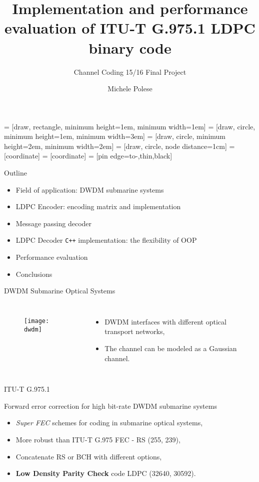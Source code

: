 \documentclass[pdf]
          {beamer}
\title{Implementation and performance evaluation of ITU-T G.975.1 LDPC binary code}
\subtitle{Channel Coding 15/16 Final Project}
\author{Michele Polese}
\begin{document}
 = [draw, rectangle, 
    minimum height=1em, minimum width=1em]
 = [draw, circle, minimum height=1em, minimum width=3em]
 = [draw, circle, minimum height=2em, minimum width=2em]
 = [draw, circle, node distance=1cm]
 = [coordinate]
 = [coordinate]
 = [pin edge={to-,thin,black}]

\begin{frame}
    \titlepage
\end{frame}
\begin{frame}{Outline}
    \begin{itemize}
    	\item Field of application: DWDM submarine systems
 		\item LDPC Encoder: encoding matrix and implementation
 		\item Message passing decoder
 		\item LDPC Decoder \texttt{C++} implementation: the flexibility of OOP
 		\item Performance evaluation
 		\item Conclusions
	\end{itemize}
\end{frame}

\begin{frame}{DWDM Submarine Optical Systems}
	\begin{columns}
			\begin{figure}
				\centering
				\texttt{[image: dwdm]}
			\end{figure}
			\begin{itemize}
				\item DWDM interfaces with different optical transport networks,
				\item The channel can be modeled as a Gaussian channel.
			\end{itemize}
	\end{columns}
\end{frame}

\begin{frame}{ITU-T G.975.1}
	\begin{center}
	Forward error correction for high bit-rate DWDM submarine systems 
	\end{center}
	\begin{itemize}
		\item \textit{Super FEC} schemes for coding in submarine optical systems,
		\item More robust than ITU-T G.975 FEC - RS (255, 239),
		\item Concatenate RS or BCH with different options,
		\item \textbf{Low Density Parity Check} code LDPC (32640, 30592).
	\end{itemize}
	
\end{frame}
\end{document}

